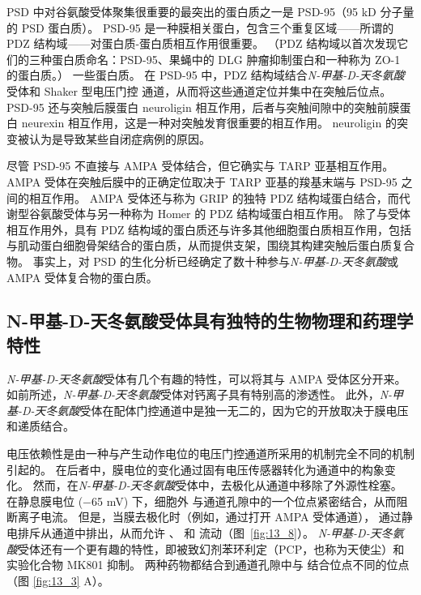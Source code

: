 PSD 中对谷氨酸受体聚集很重要的最突出的蛋白质之一是 PSD-95（95 kD 分子量的 PSD 蛋白质）。
PSD-95 是一种膜相关蛋白，包含三个重复区域——所谓的 PDZ 结构域——对蛋白质-蛋白质相互作用很重要。 （PDZ 结构域以首次发现它们的三种蛋白质命名：PSD-95、果蝇中的 DLG 肿瘤抑制蛋白和一种称为 ZO-1 的蛋白质。） 一些蛋白质。
在 PSD-95 中，PDZ 结构域结合\textit{N-甲基-D-天冬氨酸}受体和 Shaker 型电压门控  通道，从而将这些通道定位并集中在突触后位点。
PSD-95 还与突触后膜蛋白 neuroligin 相互作用，后者与突触间隙中的突触前膜蛋白 neurexin 相互作用，这是一种对突触发育很重要的相互作用。 neuroligin 的突变被认为是导致某些自闭症病例的原因。


尽管 PSD-95 不直接与 AMPA 受体结合，但它确实与 TARP 亚基相互作用。
AMPA 受体在突触后膜中的正确定位取决于 TARP 亚基的羧基末端与 PSD-95 之间的相互作用。
AMPA 受体还与称为 GRIP 的独特 PDZ 结构域蛋白结合，而代谢型谷氨酸受体与另一种称为 Homer 的 PDZ 结构域蛋白相互作用。
除了与受体相互作用外，具有 PDZ 结构域的蛋白质还与许多其他细胞蛋白质相互作用，包括与肌动蛋白细胞骨架结合的蛋白质，从而提供支架，围绕其构建突触后蛋白质复合物。
事实上，对 PSD 的生化分析已经确定了数十种参与\textit{N-甲基-D-天冬氨酸}或 AMPA 受体复合物的蛋白质。



\subsection{N-甲基-D-天冬氨酸受体具有独特的生物物理和药理学特性}

\textit{N-甲基-D-天冬氨酸}受体有几个有趣的特性，可以将其与 AMPA 受体区分开来。
如前所述，\textit{N-甲基-D-天冬氨酸}受体对钙离子具有特别高的渗透性。
此外，\textit{N-甲基-D-天冬氨酸}受体在配体门控通道中是独一无二的，因为它的开放取决于膜电压和递质结合。


电压依赖性是由一种与产生动作电位的电压门控通道所采用的机制完全不同的机制引起的。
在后者中，膜电位的变化通过固有电压传感器转化为通道中的构象变化。
然而，在\textit{N-甲基-D-天冬氨酸}受体中，去极化从通道中移除了外源性栓塞。
在静息膜电位 (−65 mV) 下，细胞外  与通道孔隙中的一个位点紧密结合，从而阻断离子电流。
但是，当膜去极化时（例如，通过打开 AMPA 受体通道）， 通过静电排斥从通道中排出，从而允许 、 和  流动（图~\ref{fig:13_8}）。 
\textit{N-甲基-D-天冬氨酸}受体还有一个更有趣的特性，即被致幻剂苯环利定（PCP，也称为天使尘）和实验化合物 MK801 抑制。
两种药物都结合到通道孔隙中与  结合位点不同的位点（图 \ref{fig:13_3} A）。


